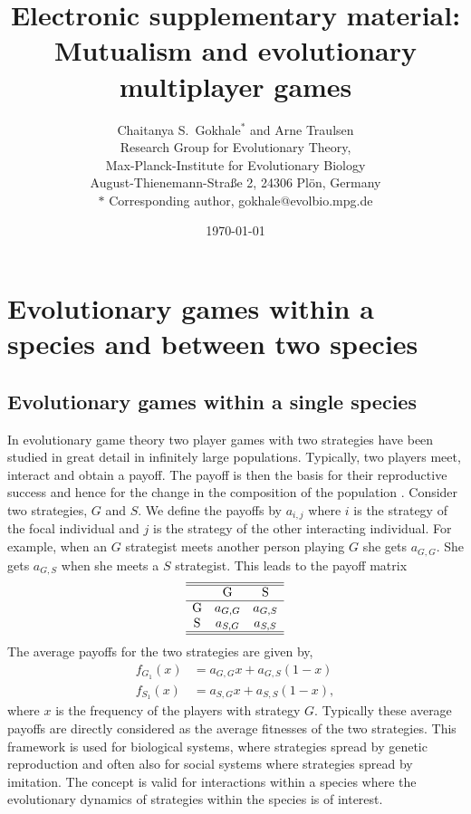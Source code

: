 \documentclass[12pt]{article}
\title{\vspace*{-22mm}\bf Electronic supplementary material: Mutualism and evolutionary multiplayer games}
\author{Chaitanya S.~Gokhale$^{\ast}$ and Arne Traulsen\\
\vspace{-2mm}\normalsize  Research Group for Evolutionary Theory,\\
\vspace{-2mm}\normalsize  Max-Planck-Institute for Evolutionary Biology\\
\vspace{-2mm}\normalsize  August-Thienemann-Stra{\ss}e 2, 24306 Pl\"{o}n, Germany\\
\vspace{-2mm}\normalsize $\ast$ Corresponding author, gokhale@evolbio.mpg.de}
\date{\normalsize\today}
\begin{document}
\linenumbers
\maketitle


\section*{
Evolutionary games within a species and between two species
}
\subsection*{Evolutionary games within a single species}
\label{withinsp}
In evolutionary game theory two player games with two strategies have been studied in great detail in infinitely large populations.
Typically, two players meet, interact and obtain a payoff. 
The payoff is then the basis for their reproductive success and hence for the change in the composition of the population \cite{maynard-smith:book:1982}.
Consider two strategies, $G$ and $S$.
We define the payoffs by $a_{i,j}$ where $i$ is the strategy of the focal individual and $j$ is the strategy of the other interacting individual.
For example, when an $G$ strategist meets another person playing $G$ she gets $a_{G,G}$.
She gets $a_{G,S}$ when she meets a $S$ strategist.
This leads to the payoff matrix
%
\begin{equation}\label{eq:twobytwo}
\begin{array}{ccc}
\hline\hline
 &$G$	&	$S$\\
\hline
$G$ 	& a_{G,G} &	a_{G,S} 
 \\
 $S$ 	&  a_{S,G} &a_{S,S} \nonumber \\
 \hline\hline
\end{array}
\end{equation}
%
The average payoffs for the two strategies are given by, %
\begin{eqnarray}
f_{G_1} (x) &= a_{G,G} x + a_{G,S} (1-x) \nonumber \\
f_{S_1} (x) &= a_{S,G} x + a_{S,S} (1-x), \nonumber
\end{eqnarray}
%
where $x$ is the frequency of the players with strategy $G$.
Typically these average payoffs are directly considered as the average fitnesses of the two strategies.
This framework is used for biological systems, where strategies spread by genetic reproduction and often also for social systems where strategies spread by imitation.
The concept is valid for interactions within a species where the evolutionary dynamics of strategies within the species is of interest.
\end{document}
